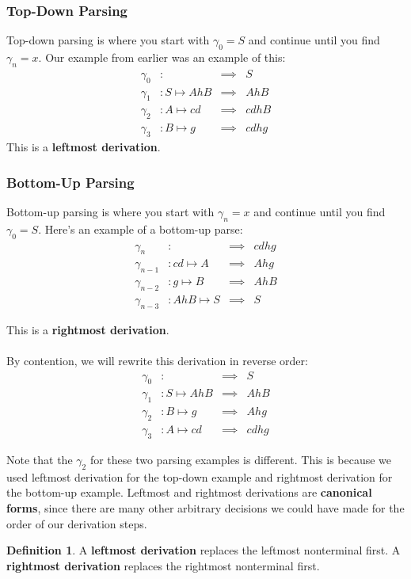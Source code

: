 \documentclass[]{article}
\theoremstyle{definition}
\newtheorem*{defn}{Definition}
\begin{document}
			\subsubsection{Top-Down Parsing}
				Top-down parsing is where you start with $\gamma_0 = S$ and continue until you find $\gamma_n = x$. Our example from earlier was an example of this:
				\begin{align*}
					\gamma_0&: &\implies& S \\
					\gamma_1&: S \mapsto AhB &\implies& AhB \\
					\gamma_2&: A \mapsto cd &\implies& cdhB \\
					\gamma_3&: B \mapsto g &\implies& cdhg
				\end{align*}
				This is a \textbf{leftmost derivation}.

			\subsubsection{Bottom-Up Parsing}
				Bottom-up parsing is where you start with $\gamma_n = x$ and continue until you find $\gamma_0 = S$. Here's an example of a bottom-up parse:
				\begin{align*}
					\gamma_n&: &\implies& cdhg \\
					\gamma_{n - 1}&: cd \mapsto A &\implies& Ahg \\
					\gamma_{n - 2}&: g \mapsto B &\implies& AhB \\
					\gamma_{n - 3}&: AhB \mapsto S &\implies& S 
				\end{align*}

				This is a \textbf{rightmost derivation}.
				\\ \\
				By contention, we will rewrite this derivation in reverse order:
				\begin{align*}
					\gamma_0&: &\implies& S \\
					\gamma_1&: S \mapsto AhB &\implies& AhB \\
					\gamma_2&: B \mapsto g &\implies& Ahg \\
					\gamma_3&: A \mapsto cd &\implies& cdhg
				\end{align*}

				Note that the $\gamma_2$ for these two parsing examples is different. This is because we used leftmost derivation for the top-down example and rightmost derivation for the bottom-up example. Leftmost and rightmost derivations are \textbf{canonical forms}, since there are many other arbitrary decisions we could have made for the order of our derivation steps.
				\begin{defn}
					A \textbf{leftmost derivation} replaces the leftmost nonterminal first. A \textbf{rightmost derivation} replaces the rightmost nonterminal first.
				\end{defn}
\end{document}
